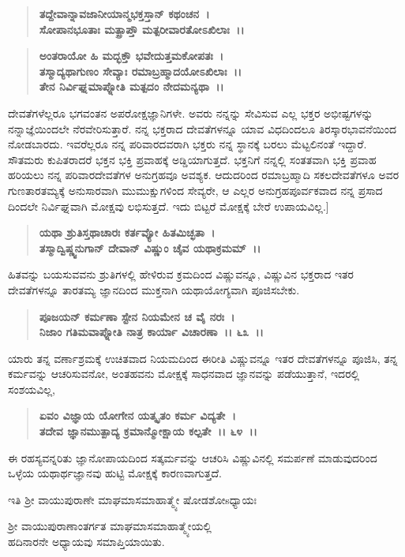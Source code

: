 \begin{verse}
\textbf{ತದ್ದೇವಾನ್ನಾವಜಾನೀಯಾನ್ಮಭಕ್ತಸ್ತಾನ್ ಕಥಂಚನ~।}\\\textbf{ಸೋಪಾನಭೂತಾಃ ಮತ್ಪ್ರಾಪ್ತೌ ಮತ್ಪರೀವಾರತೋಽಖಿಲಾಃ~।।} 
\end{verse}

\begin{verse}
\textbf{ಅಂತರಾಯೋ ಹಿ ಮದ್ಭಕ್ತೌ ಭವೇದುತ್ತಮಕೋಪತಃ~।}\\\textbf{ತಸ್ಮಾದ್ಯಥಾಗುಣಂ ಸೇವ್ಯಾಃ ರಮಾಬ್ರಹ್ಮಾದಯೋಽಖಿಲಾಃ~।। }\\\textbf{ತೇನ ನಿರ್ವಿಘ್ನಮಾಪ್ನೋತಿ ಮತ್ಪದಂ ನೇದಮನ್ಯಥಾ~।।}
\end{verse}

ದೇವತೆಗಳೆಲ್ಲರೂ ಭಗವಂತನ ಅಪರೋಕ್ಷಜ್ಞಾನಿಗಳೇ. ಅವರು ನನ್ನನ್ನು ಸೇವಿಸುವ ಎಲ್ಲ ಭಕ್ತರ ಅಭೀಷ್ಟಗಳನ್ನು ನನ್ನಾಜ್ಞೆಯಿಂದಲೇ ನೆರವೇರಿಸುತ್ತಾರೆ. ನನ್ನ ಭಕ್ತರಾದ ದೇವತೆ\-ಗಳನ್ನೂ ಯಾವ ವಿಧದಿಂದಲೂ ತಿರಸ್ಕಾರಭಾವನೆಯಿಂದ ನೋಡಬಾರದು. ಇವರೆಲ್ಲರೂ ನನ್ನ ಪರಿವಾರದವರಾಗಿ ಭಕ್ತರು ನನ್ನ ಸ್ಥಾನಕ್ಕೆ ಬರಲು ಮೆಟ್ಟಲಿನಂತೆ ಇದ್ದಾರೆ. ಸೌತಮರು ಕುಪಿತರಾದರೆ ಭಕ್ತನ ಭಕ್ತಿ ಪ್ರವಾಹಕ್ಕೆ ಅಡ್ಡಿಯಾಗುತ್ತದೆ. ಭಕ್ತನಿಗೆ ನನ್ನಲ್ಲಿ ಸಂತತವಾಗಿ ಭಕ್ತಿ ಪ್ರವಾಹ ಹರಿಯಲು ನನ್ನ ಪರಿವಾರದೇವತೆಗಳ ಅನುಗ್ರಹವೂ ಅವಶ್ಯಕ. ಆದುದರಿಂದ ರಮಾಬ್ರಹ್ಮಾದಿ ಸಕಲದೇವತೆಗಳೂ ಅವರ ಗುಣತಾರತಮ್ಯಕ್ಕೆ ಅನುಸಾರವಾಗಿ ಮುಮುಕ್ಷುಗಳಿಂದ ಸೇವ್ಯರೇ, ಆ ಎಲ್ಲರ ಅನುಗ್ರಹಪೂರ್ವಕವಾದ ನನ್ನ ಪ್ರಸಾದ ದಿಂದಲೇ ನಿರ್ವಿಘ್ನವಾಗಿ ಮೋಕ್ಷವು ಲಭಿಸುತ್ತದೆ. ಇದು ಬಿಟ್ಟರೆ ಮೋಕ್ಷಕ್ಕೆ ಬೇರೆ ಉಪಾಯವಿಲ್ಲ.]

\begin{verse}
\textbf{ಯಥಾ ಶ್ರುತಿಸ್ತಥಾಚಾರಃ ಕರ್ತವ್ಯೋ ಹಿತಮಿಚ್ಛತಾ~।}\\\textbf{ತಸ್ಮಾದ್ವಿಷ್ಣ್ವನುಗಾನ್ ದೇವಾನ್ ವಿಷ್ಣುಂ ಚೈವ ಯಥಾಕ್ರಮಮ್~।।}
\end{verse}

ಹಿತವನ್ನು ಬಯಸುವವನು ಶ್ರುತಿಗಳಲ್ಲಿ ಹೇಳಿರುವ ಕ್ರಮದಿಂದ ವಿಷ್ಣುವನ್ನೂ, ವಿಷ್ಣುವಿನ ಭಕ್ತರಾದ ಇತರ ದೇವತೆಗಳನ್ನೂ ತಾರತಮ್ಯ ಜ್ಞಾನದಿಂದ ಮುಕ್ತನಾಗಿ ಯಥಾಯೋಗ್ಯವಾಗಿ ಪೂಜಿಸಬೇಕು.

\begin{verse}
\textbf{ಪೂಜಯನ್ ಕರ್ಮಣಾ ಸ್ಟೇನ ನಿಯಮೇನ ಚ ವೈ ನರಃ~।}\\\textbf{ನಿಜಾಂ ಗತಿಮವಾಪ್ನೋತಿ ನಾತ್ರ ಕಾರ್ಯಾ ವಿಚಾರಣಾ~।। ೬೩~।।}
\end{verse}

ಯಾರು ತನ್ನ ವರ್ಣಾಶ್ರಮಕ್ಕೆ ಉಚಿತವಾದ ನಿಯಮದಿಂದ ಈರೀತಿ ವಿಷ್ಣುವನ್ನೂ ಇತರ ದೇವತೆಗಳನ್ನೂ ಪೂಜಿಸಿ, ತನ್ನ ಕರ್ಮವನ್ನು ಆಚರಿಸುವನೋ, ಅಂತಹವನು ಮೋಕ್ಷಕ್ಕೆ ಸಾಧನವಾದ ಜ್ಞಾನವನ್ನು ಪಡೆಯುತ್ತಾನೆ, ಇದರಲ್ಲಿ ಸಂಶಯವಿಲ್ಲ,

\begin{verse}
\textbf{ಏವಂ ವಿಜ್ಞಾಯ ಯೋಗೇನ ಯತ್ಕೃತಂ ಕರ್ಮ ವಿದ್ಯತೇ~।}\\\textbf{ತದೇವ ಜ್ಞಾನಮುತ್ಪಾದ್ಯ ಕ್ರಮಾನ್ಮೋಕ್ಷಾಯ ಕಲ್ಪತೇ~।। ೬೪~।।}
\end{verse}

ಈ ರಹಸ್ಯವನ್ನರಿತು ಜ್ಞಾನೋಪಾಯದಿಂದ ಸತ್ಕರ್ಮವನ್ನು ಆಚರಿಸಿ ವಿಷ್ಣುವಿನಲ್ಲಿ ಸಮರ್ಪಣೆ ಮಾಡುವುದರಿಂದ ಒಳ್ಳೆಯ ಯಥಾರ್ಥಜ್ಞಾನವು ಹುಟ್ಟಿ ಮೋಕ್ಷಕ್ಕೆ ಕಾರಣವಾಗುತ್ತದೆ.

\begin{center}
ಇತಿ ಶ‍್ರೀ ವಾಯುಪುರಾಣೇ ಮಾಘಮಾಸಮಾಹಾತ್ಮ್ಯೇ ಷೋಡಶೋsಧ್ಯಾಯಃ
\end{center}

\begin{center}
ಶ‍್ರೀ ವಾಯುಪುರಾಣಾಂತರ್ಗತ ಮಾಘಮಾಸಮಾಹಾತ್ಮ್ಯೇಯಲ್ಲಿ \\ ಹದಿನಾರನೇ ಅಧ್ಯಾಯವು ಸಮಾಪ್ತಿಯಾಯಿತು.
\end{center}

\delimiter

